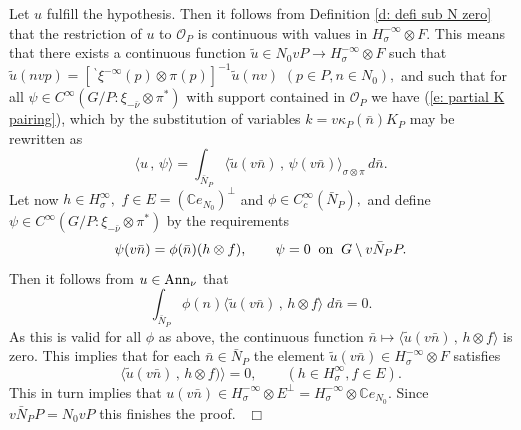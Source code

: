 \documentclass[12pt,a4paper]{article}
\def\proof{\par\noindent{\it Proof.}{\ }{\ }}
\def\qed{~\hfill\hbox{$\Box$}\medbreak}
\def\qquad{\quad\quad}
\def\msy#1{{\mathbb #1}}
\def\C{{\msy C}}
\def\gs{\sigma}
\def\to{\rightarrow}
\def\inp#1#2{\langle#1\,,\,#2\rangle}
\def\cO{{\mathcal O}}
\numberwithin{Thm}{section}
\numberwithin{equation}{section}
\numberwithin{equation}{section}
\def\bp{\!{\,}^\backprime}
\begin{document}
 \proof
Let $u$ fulfill the hypothesis.
Then it follows from Definition \ref{d: defi sub N zero}
that the restriction of $u$ to $\cO_P$ 
is continuous with values in $H_\gs^{-\infty} \otimes F.$ 
This means that there exists a continuous function $\tilde u \in N_0 v P \to H_\gs^{-\infty} \otimes F$ 
such that $\tilde u(n v p) = [\bp \xi^{-\infty}(p) \otimes \pi(p) ]^{-1} \tilde u(n v)$  $(p \in P, n \in N_0),$ 
and such that for all $\psi \in C^\infty(G/P: \xi_{-\bar \nu} \otimes \pi^*)$  with support contained
in $\cO_P$ we have (\ref{e: partial K pairing}), which by the substitution of variables $k = 
v \kappa_P(\bar n)K_P$ may be rewritten 
as
$$ 
\inp{u}{\psi} = \int_{\bar N_P} \inp{\tilde u ( v \bar n) }{\psi(v \bar n)}_{\gs \otimes \pi} \,d \bar n. 
$$ 
 Let now $h \in H_\gs^\infty,$ $f \in E= (\C e_{N_0})^\perp$ and  $\phi \in C^\infty_c(\bar N_P),$ and define 
$ \psi \in C^\infty(G/P:\xi_{-\bar \nu} \otimes \pi^*)$ by the requirements
$$ 
\psi(v \bar n ) = \phi(\bar n) ( h \otimes f) , \qquad \psi = 0 \;\;{\rm on} \;\;G\setminus v\bar N_P P.
$$ 
Then it follows from $u \in {\rm Ann}_\nu$ that
$$ 
\int_{\bar N_P} \phi(n) \inp{\tilde u (v \bar n)}{h \otimes f} \; d\bar n = 0.
$$ 
As this is valid for all $\phi$ as above, the continuous function $\bar n \mapsto \inp {\tilde u(v \bar n)}{ h \otimes f}$ 
is zero. This implies that for each $\bar n \in \bar N_P$ the element $\tilde u(v\bar n) \in H_\gs^{-\infty} \otimes F$
satisfies 
$$ 
\inp{\tilde u(v\bar n)}{h \otimes f)} = 0,\qquad (h \in H_\gs^\infty, f \in E).
$$ This in turn implies that $u(v \bar n) \in 
H^{-\infty}_\gs \otimes E^\perp = H^{-\infty}_\gs \otimes \C e_{N_0}.$ 
Since $v \bar N_P P = N_0 v P $ this finishes the proof.
\qed
\end{document}
